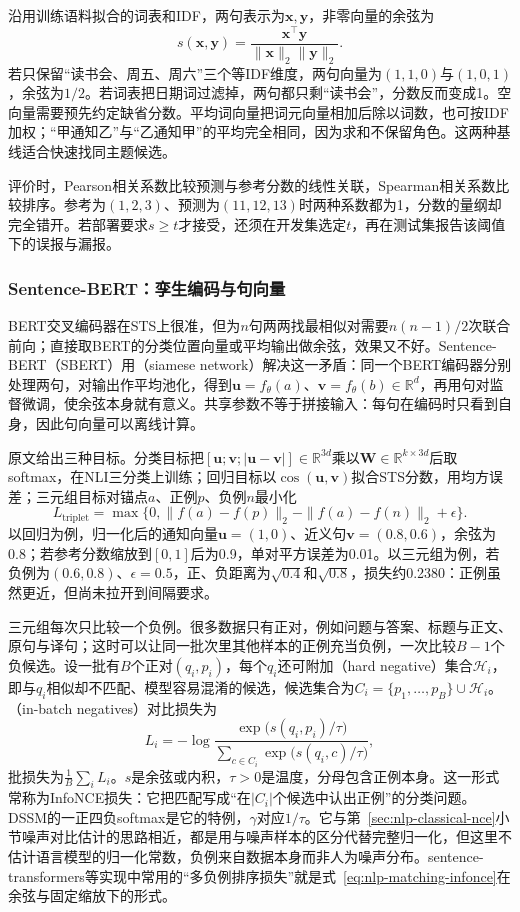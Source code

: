 沿用训练语料拟合的词表和IDF，两句表示为$\bm x,\bm y$，非零向量的余弦为
\[
  s(\bm x,\bm y)=\frac{\bm x^\top\bm y}{\|\bm x\|_2\|\bm y\|_2}.
\]
若只保留“读书会、周五、周六”三个等IDF维度，两句向量为$(1,1,0)$与$(1,0,1)$，余弦为$1/2$。若词表把日期词过滤掉，两句都只剩“读书会”，分数反而变成1。空向量需要预先约定缺省分数。平均词向量把词元向量相加后除以词数，也可按IDF加权；“甲通知乙”与“乙通知甲”的平均完全相同，因为求和不保留角色。这两种基线适合快速找同主题候选。

评价时，Pearson相关系数比较预测与参考分数的线性关联，Spearman相关系数比较排序。参考为$(1,2,3)$、预测为$(11,12,13)$时两种系数都为1，分数的量纲却完全错开。若部署要求$s\geq t$才接受，还须在开发集选定$t$，再在测试集报告该阈值下的误报与漏报。

\subsubsection{Sentence-BERT：孪生编码与句向量}
\label{sec:nlp-classification-sbert}

BERT交叉编码器在STS上很准，但为$n$句两两找最相似对需要$n(n-1)/2$次联合前向；直接取BERT的分类位置向量或平均输出做余弦，效果又不好。Sentence-BERT（SBERT）用（siamese network）解决这一矛盾：同一个BERT编码器分别处理两句，对输出作平均池化，得到$\bm u=f_\theta(a)$、$\bm v=f_\theta(b)\in\mathbb R^{d}$，再用句对监督微调，使余弦本身就有意义。共享参数不等于拼接输入：每句在编码时只看到自身，因此句向量可以离线计算。

原文给出三种目标。分类目标把$[\bm u;\bm v;|\bm u-\bm v|]\in\mathbb R^{3d}$乘以$\bm W\in\mathbb R^{k\times3d}$后取softmax，在NLI三分类上训练；回归目标以$\cos(\bm u,\bm v)$拟合STS分数，用均方误差；三元组目标对锚点$a$、正例$p$、负例$n$最小化
\[
  L_{\mathrm{triplet}}=\max\{0,\|f(a)-f(p)\|_2-\|f(a)-f(n)\|_2+\epsilon\}.
\]
以回归为例，归一化后的通知向量$\bm u=(1,0)$、近义句$\bm v=(0.8,0.6)$，余弦为0.8；若参考分数缩放到$[0,1]$后为0.9，单对平方误差为0.01。以三元组为例，若负例为$(0.6,0.8)$、$\epsilon=0.5$，正、负距离为$\sqrt{0.4}$和$\sqrt{0.8}$，损失约0.2380：正例虽然更近，但尚未拉开到间隔要求。

三元组每次只比较一个负例。很多数据只有正对，例如问题与答案、标题与正文、原句与译句；这时可以让同一批次里其他样本的正例充当负例，一次比较$B-1$个负候选。设一批有$B$个正对$(q_i,p_i)$，每个$q_i$还可附加（hard negative）集合$\mathcal H_i$，即与$q_i$相似却不匹配、模型容易混淆的候选，候选集合为$C_i=\{p_1,\ldots,p_B\}\cup\mathcal H_i$。（in-batch negatives）对比损失为
\begin{equation}
  L_i=-\log\frac{\exp\bigl(s(q_i,p_i)/\tau\bigr)}
  {\sum_{c\in C_i}\exp\bigl(s(q_i,c)/\tau\bigr)},
  \label{eq:nlp-matching-infonce}
\end{equation}
批损失为$\frac1B\sum_iL_i$。$s$是余弦或内积，$\tau>0$是温度，分母包含正例本身。这一形式常称为InfoNCE损失\cite{nlp-matching-oord2018cpc}：它把匹配写成“在$|C_i|$个候选中认出正例”的分类问题。DSSM的一正四负softmax是它的特例，$\gamma$对应$1/\tau$。它与第~\ref{sec:nlp-classical-nce}小节噪声对比估计的思路相近，都是用与噪声样本的区分代替完整归一化，但这里不估计语言模型的归一化常数，负例来自数据本身而非人为噪声分布。sentence-transformers等实现中常用的“多负例排序损失”就是式~\eqref{eq:nlp-matching-infonce}在余弦与固定缩放下的形式。

